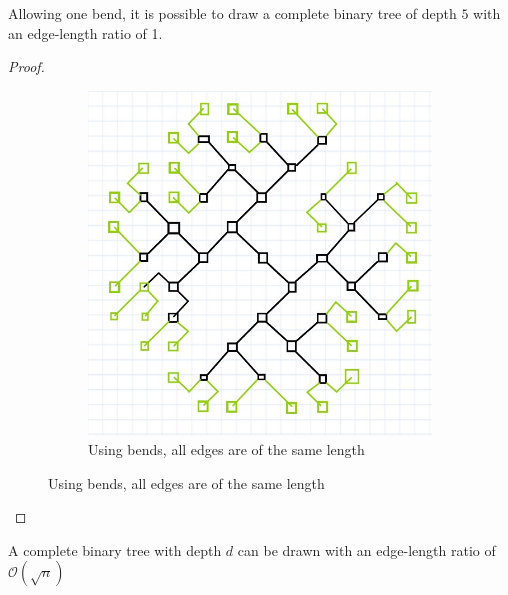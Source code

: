 \begin{lemma}
	Allowing one bend, it is possible to draw a complete binary tree of depth $5$ with an edge-length ratio of 1.
\end{lemma}
\begin{proof}
		\begin{figure}[H]
		\centering
		\begin{subfigure}{0.8\textwidth}
			\centering
			\includegraphics[width=0.5\linewidth,page=9]{drawings/bintree-with-bends.jpg}
			\caption*{Using bends, all edges are of the same length}
		\end{subfigure}
	\end{figure}
\end{proof}
\begin{theorem}
	A complete binary tree with depth $d$ can be drawn with an edge-length ratio of $\mathcal{O}(\sqrt{n})$
\end{theorem}
